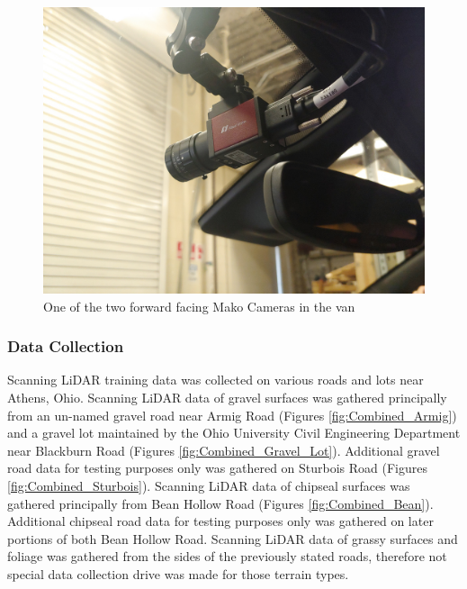 \documentclass[numbered,pdftex]{ohio-etd}
\begin{document}
{{{{				\begin{figure}[H]
					\centering
					\includegraphics[width=0.7\linewidth]{Defense_Images/Mako_Camera}
					\caption[Mako Camera]{One of the two forward facing Mako Cameras in the van}
					\label{fig:makocamera}
				\end{figure}
			
			}
			
			\subsubsection{Data Collection}{
			
				{Scanning LiDAR training data was collected on various roads and lots near Athens, Ohio. Scanning LiDAR data of gravel surfaces was gathered principally from an un-named gravel road near Armig Road (Figures \ref{fig:Combined_Armig}) and a gravel lot maintained by the Ohio University Civil Engineering Department near Blackburn Road (Figures \ref{fig:Combined_Gravel_Lot}). Additional gravel road data for testing purposes only was gathered on Sturbois Road (Figures \ref{fig:Combined_Sturbois}). Scanning LiDAR data of chipseal surfaces was gathered principally from Bean Hollow Road (Figures \ref{fig:Combined_Bean}). Additional chipseal road data for testing purposes only was gathered on later portions of both Bean Hollow Road. Scanning LiDAR data of grassy surfaces and foliage was gathered from the sides of the previously stated roads, therefore not special data collection drive was made for those terrain types.}
				
				
}}}}
\end{document}
